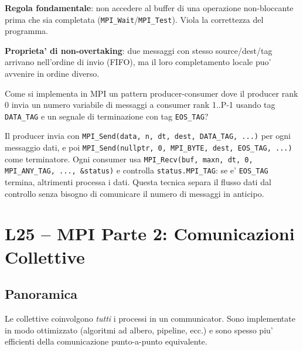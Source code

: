 \documentclass[11pt,a4paper]{article}
\theoremstyle{remark}
\newenvironment{esercizio}[1][]{%
  \begin{tcolorbox}[breakable,title={\textbf{Esercizio / Domanda d'esame}\ifx&#1&\else: #1\fi},
    colback=yellow!5!white, colframe=orange!75!black, fonttitle=\small\bfseries]%
}{%
  \end{tcolorbox}%
}
\newenvironment{risposta}{%
  \begin{tcolorbox}[breakable,title={\textbf{Risposta}},
    colback=green!5!white, colframe=green!50!black, fonttitle=\small\bfseries]%
}{%
  \end{tcolorbox}%
}
\begin{document}
\textbf{Regola fondamentale}: non accedere al buffer di una operazione non-bloccante prima che sia completata (\lstinline|MPI_Wait|/\lstinline|MPI_Test|). Viola la correttezza del programma.

\textbf{Proprieta' di non-overtaking}: due messaggi con stesso source/dest/tag arrivano nell'ordine di invio (FIFO), ma il loro completamento locale puo' avvenire in ordine diverso.

\begin{esercizio}
Come si implementa in MPI un pattern producer-consumer dove il producer rank 0 invia un numero variabile di messaggi a consumer rank 1..P-1 usando tag \lstinline|DATA_TAG| e un segnale di terminazione con tag \lstinline|EOS_TAG|?
\end{esercizio}
\begin{risposta}
Il producer invia con \lstinline|MPI_Send(data, n, dt, dest, DATA_TAG, ...)| per ogni messaggio dati, e poi \lstinline|MPI_Send(nullptr, 0, MPI_BYTE, dest, EOS_TAG, ...)| come terminatore. Ogni consumer usa \lstinline|MPI_Recv(buf, maxn, dt, 0, MPI_ANY_TAG, ..., &status)| e controlla \lstinline|status.MPI_TAG|: se e' \lstinline|EOS_TAG| termina, altrimenti processa i dati. Questa tecnica separa il flusso dati dal controllo senza bisogno di comunicare il numero di messaggi in anticipo.
\end{risposta}

\section{L25 -- MPI Parte 2: Comunicazioni Collettive}

\subsection{Panoramica}

Le collettive coinvolgono \emph{tutti} i processi in un communicator. Sono implementate in modo ottimizzato (algoritmi ad albero, pipeline, ecc.) e sono spesso piu' efficienti della comunicazione punto-a-punto equivalente.
\end{document}
